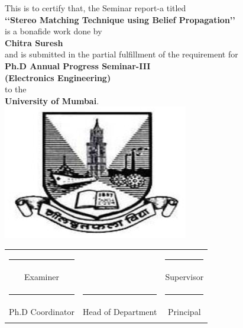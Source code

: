\begin{center}
\large This is to certify that, the Seminar report-a titled
\vspace{0.15in}\\\textbf{\lq\lq  Stereo Matching Technique using Belief Propagation\rq\rq} \\
\vspace{0.1in}is a bonafide work done by\vspace{0.15in}
\\\textbf {Chitra Suresh} \\
 and is submitted in the partial
fulfillment of
the requirement for   \vspace{0.15in} \\\textbf{Ph.D Annual Progress Seminar-III} \vspace{0.05in}\\\textbf{(Electronics Engineering)} \\to the \\\textbf{University
of Mumbai}.\\

\includegraphics{university.eps}

 \vspace{1.2in}

\begin{tabular}{ccc}

      \rule{4.0cm}{1sp} & \hspace{0.7in}                & \hspace{0.3in} \rule{4.0cm}{1sp} \\ \vspace{0.65in}
       Examiner & \hspace{1in}             & \hspace{0.3in} Supervisor \\
      \rule{4.0cm}{1sp} & \hspace{0.5in} \rule{4.0cm}{1sp}                  &\hspace{0.45in} \rule{4.0cm}{1sp} \\
      Ph.D  Coordinator & \hspace{0.5in} Head of Department                &\hspace{0.65in} Principal \\\\
    \end{tabular}
\end{center}





